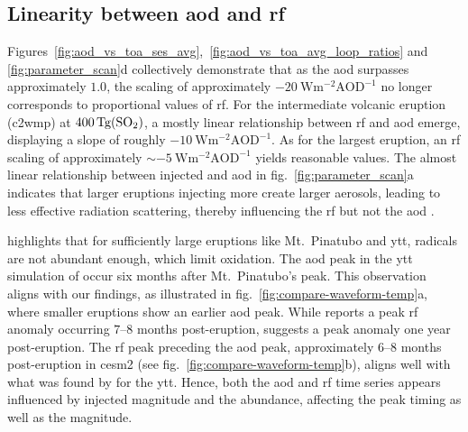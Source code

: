 \documentclass{ametsocV6.1}
\newcommand{\iso}[1][i]{{#1}njected \ce{SO2}}
\begin{document}

\subsection{Linearity between \gls{aod} and \gls{rf}}

Figures~\ref{fig:aod_vs_toa_ses_avg},~\ref{fig:aod_vs_toa_avg_loop_ratios} and
\ref{fig:parameter_scan}d collectively demonstrate that as the \gls{aod} surpasses
approximately \(1.0\), the scaling of approximately
\(\SI{-20}{\watt\metre^{-2}\mathrm{AOD}^{-1}}\) no longer corresponds to proportional
values of \gls{rf}. For the intermediate volcanic eruption (\gls{c2wmp}) at
\(\SI{400}{\tera\gram(\ce{SO2})}\), a mostly linear relationship between \gls{rf} and
\gls{aod} emerge, displaying a slope of roughly
\(\SI{-10}{\watt\metre^{-2}\mathrm{AOD}^{-1}}\). As for the largest eruption, an
\gls{rf} scaling of approximately \(\sim \SI{-5}{\watt\metre^{-2}\mathrm{AOD}^{-1}}\)
yields reasonable values. The almost linear relationship between \iso{} and \gls{aod} in
fig.~\ref{fig:parameter_scan}a indicates that larger eruptions injecting more 
create larger aerosols, leading to less effective radiation scattering, thereby
influencing the \gls{rf} but not the \gls{aod} \citep{english2013, timmreck2010,
  timmreck2018}.

\citet{timmreck2010} highlights that for sufficiently large eruptions like Mt.\ Pinatubo
and \gls{ytt},  radicals are not abundant enough, which limit  oxidation.
The \gls{aod} peak in the \gls{ytt} simulation of \citet{timmreck2010} occur six months
after Mt.\ Pinatubo's peak. This observation aligns with our findings, as illustrated in
fig.~\ref{fig:compare-waveform-temp}a, where smaller eruptions show an earlier \gls{aod}
peak. While \citet{timmreck2010} reports a peak \gls{rf} anomaly occurring \(7\)--\(8\)
months post-eruption, \citet{jones2005} suggests a peak anomaly one year post-eruption.
The \gls{rf} peak preceding the \gls{aod} peak, approximately \(6\)--\(8\) months
post-eruption in \gls{cesm2} (see fig.~\ref{fig:compare-waveform-temp}b), aligns well
with what was found by \citet{timmreck2010} for the \gls{ytt}. Hence, both the \gls{aod}
and \gls{rf} time series appears influenced by \iso{} magnitude and the 
abundance, affecting the peak timing as well as the magnitude.
\end{document}
